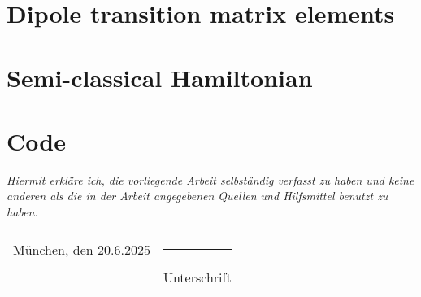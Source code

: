 \documentclass[12pt]{report}
\begin{document}
\chapter{Dipole transition matrix elements}

\newpage


\chapter{Semi-classical Hamiltonian}

\newpage


\chapter{Code}

\newpage




\newpage


\emph{Hiermit erkläre ich, die vorliegende Arbeit selbständig verfasst zu haben und keine anderen als die in der Arbeit angegebenen Quellen und Hilfsmittel benutzt zu haben.}

\vspace{2cm}  
\noindent
\begin{tabular}{p{7cm} p{7cm}}
    München, den 20.6.2025 & \rule{6cm}{0.4pt} \\  
    & Unterschrift
\end{tabular}
\end{document}
